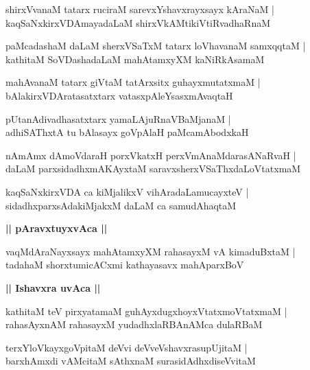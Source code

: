 \documentclass[twoside,12pt,openright]{book}
\newcounter{shloka}[chapter]
\def\uvaca#1{\centerline{{\large\textbf{#1}}}}
\begin{document}
\begin{shloka}%
shirxVvanaM tatarx ruciraM sarevxYshavxrayxsayx kAraNaM |\\
kaqSaNxkirxVDAmayadaLaM shirxVkAMtikiVtiRvadhaRnaM 
\end{shloka}

\begin{shloka}%
paMcadashaM daLaM sherxVSaTxM tatarx loVhavanaM samxqqtaM |\\
kathitaM SoVDashadaLaM mahAtamxyXM kaNiRkAsamaM 
\end{shloka}

\begin{shloka}%
mahAvanaM tatarx giVtaM tatArxsitx guhayxmutatxmaM |\\
bAlakirxVDAratasatxtarx vatasxpAleYsasxmAvaqtaH 
\end{shloka}

\begin{shloka}%
pUtanAdivadhasatxtarx yamaLAjuRnaVBaMjanaM |\\
adhiSAThxtA tu bAlasayx goVpAlaH paMcamAbodxkaH 
\end{shloka}

\begin{shloka}%
nAmAmx dAmoVdaraH porxVkatxH perxVmAnaMdarasANaRvaH |\\
daLaM parxsidadhxmAKAyxtaM saravxsherxVSaThxdaLoVtatxmaM 
\end{shloka}

\begin{shloka}%
kaqSaNxkirxVDA ca kiMjalikxV vihAradaLamucayxteV |\\
sidadhxparxsAdakiMjakxM daLaM ca samudAhaqtaM 
\end{shloka}

\uvaca{|| pAravxtuyxvAca ||}

\begin{shloka}%
vaqMdAraNayxsayx mahAtamxyXM rahasayxM vA kimaduBxtaM |\\
tadahaM shorxtumicACxmi kathayasavx mahAparxBoV 
\end{shloka}

\uvaca{|| Ishavxra uvAca ||}

\begin{shloka}%
kathitaM teV pirxyatamaM guhAyxdugxhoyxVtatxmoVtatxmaM |\\
rahasAyxnAM rahasayxM yudadhxlaRBAnAMca dulaRBaM 
\end{shloka}

\begin{shloka}%
terxYloVkayxgoVpitaM deVvi deVveVshavxrasupUjitaM |\\
barxhAmxdi vAMcitaM sAthxnaM surasidAdhxdiseVvitaM 
\end{shloka}
\end{document}
